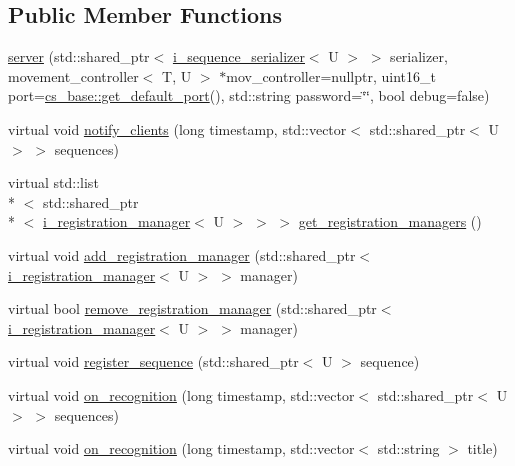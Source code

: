\subsection*{Public Member Functions}
\begin{DoxyCompactItemize}
\item 
\hyperlink{classmae_1_1eventing_1_1server_aa160bd2b2d0398161b4218a0a74a651c}{server} (std\-::shared\-\_\-ptr$<$ \hyperlink{classmae_1_1eventing_1_1i__sequence__serializer}{i\-\_\-sequence\-\_\-serializer}$<$ U $>$ $>$ serializer, movement\-\_\-controller$<$ T, U $>$ $\ast$mov\-\_\-controller=nullptr, uint16\-\_\-t port=\hyperlink{classmae_1_1eventing_1_1cs__base_a5c068f50b548ec7299133976c00fa5a4}{cs\-\_\-base\-::get\-\_\-default\-\_\-port}(), std\-::string password=\char`\"{}\char`\"{}, bool debug=false)
\item 
virtual void \hyperlink{classmae_1_1eventing_1_1server_a94954a9ac22bbd73c36886815822fb8c}{notify\-\_\-clients} (long timestamp, std\-::vector$<$ std\-::shared\-\_\-ptr$<$ U $>$ $>$ sequences)
\item 
virtual std\-::list\\*
$<$ std\-::shared\-\_\-ptr\\*
$<$ \hyperlink{classmae_1_1eventing_1_1i__registration__manager}{i\-\_\-registration\-\_\-manager}$<$ U $>$ $>$ $>$ \hyperlink{classmae_1_1eventing_1_1server_acc7baf90eabaf3b7da1892d1ae95217e}{get\-\_\-registration\-\_\-managers} ()
\item 
virtual void \hyperlink{classmae_1_1eventing_1_1server_a7605c3953ad60a1ead4bc74c3085dcb5}{add\-\_\-registration\-\_\-manager} (std\-::shared\-\_\-ptr$<$ \hyperlink{classmae_1_1eventing_1_1i__registration__manager}{i\-\_\-registration\-\_\-manager}$<$ U $>$ $>$ manager)
\item 
virtual bool \hyperlink{classmae_1_1eventing_1_1server_a95e6e7b3e36fe6aaba85bbd5f4ca923f}{remove\-\_\-registration\-\_\-manager} (std\-::shared\-\_\-ptr$<$ \hyperlink{classmae_1_1eventing_1_1i__registration__manager}{i\-\_\-registration\-\_\-manager}$<$ U $>$ $>$ manager)
\item 
virtual void \hyperlink{classmae_1_1eventing_1_1server_ad2d13686ace9b9edac090834f82ef1b4}{register\-\_\-sequence} (std\-::shared\-\_\-ptr$<$ U $>$ sequence)
\item 
virtual void \hyperlink{classmae_1_1eventing_1_1server_adb20e7fbaa2413ea1897f2d0687c4e16}{on\-\_\-recognition} (long timestamp, std\-::vector$<$ std\-::shared\-\_\-ptr$<$ U $>$ $>$ sequences)
\item 
virtual void \hyperlink{classmae_1_1eventing_1_1server_a52c97fd5f391c6b26625201eb5d58c48}{on\-\_\-recognition} (long timestamp, std\-::vector$<$ std\-::string $>$ title)
\end{DoxyCompactItemize}
